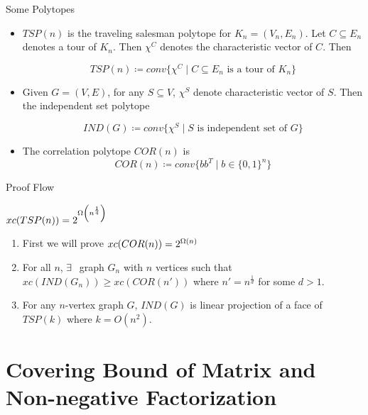\documentclass[aspectratio=1610, handout]{beamer}
\begin{document}
\begin{frame}{Some Polytopes}

	\begin{itemize}
		\item $TSP(n)$ is the traveling salesman polytope for $K_n=(V_n,E_n)$. Let $C\subseteq E_n$ denotes a tour of $K_n$. Then $\chi^C$ denotes the characteristic vector of $C$. Then \pause

		      $$TSP(n)\coloneqq conv\{\chi^C\mid C\subseteq E_n\text{ is a tour of $K_n$}\}$$\pause

		\item Given $G=(V,E)$, for any $S\subseteq V$, $\chi^S$ denote characteristic vector of $S$. Then the independent set polytope\pause

		      $$IND(G)\coloneqq conv\{\chi^S\mid S\text{ is independent set of $G$}\}$$
		\item The correlation polytope $COR(n)$ is $$COR(n)\coloneqq conv\{bb^T\mid b\in\{0,1\}^n\}$$
	\end{itemize}
\end{frame}
\begin{frame}{Proof Flow}
	\begin{theorem}
		$xc(TSP(n))=2^{\Omega\left(n^{\frac14}\right)}$
	\end{theorem}\pause

	\begin{enumerate}[label=Step \arabic*:]
		\item First we will prove $xc(COR(n))=2^{\Omega(n)}$\pause \vspace*{5mm}

		\item For all $n$, $\exists\ $ graph $G_n$ with $n$ vertices such that $xc(IND(G_n))\geq xc(COR(n'))$ where $n'=n^{\frac1d}$ for some $d>1$.\pause\vspace*{5mm}

		\item For any $n$-vertex graph $G$, $IND(G)$ is linear projection of a face of $TSP(k)$ where $k=O(n^2)$.
	\end{enumerate}
\end{frame}

\section{Covering Bound of Matrix and Non-negative Factorization}
\end{document}
